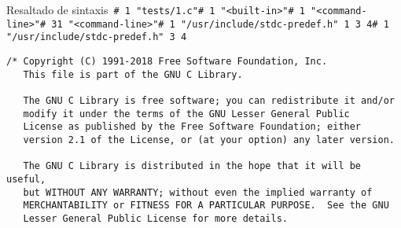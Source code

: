 \begin{frame}{Resaltado de sintaxis}~\color{MidnightBlue}\verb$# 1 "tests/1.c"$\newline\color{MidnightBlue}\verb$# 1 "<built-in>"$\newline\color{MidnightBlue}\verb$# 1 "<command-line>"$\newline\color{MidnightBlue}\verb$# 31 "<command-line>"$\newline\color{MidnightBlue}\verb$# 1 "/usr/include/stdc-predef.h" 1 3 4$\newline\newline\color{MidnightBlue}\verb$# 1 "/usr/include/stdc-predef.h" 3 4$\newline\color{Gray}\begin{verbatim}/* Copyright (C) 1991-2018 Free Software Foundation, Inc.
   This file is part of the GNU C Library.

   The GNU C Library is free software; you can redistribute it and/or
   modify it under the terms of the GNU Lesser General Public
   License as published by the Free Software Foundation; either
   version 2.1 of the License, or (at your option) any later version.

   The GNU C Library is distributed in the hope that it will be useful,
   but WITHOUT ANY WARRANTY; without even the implied warranty of
   MERCHANTABILITY or FITNESS FOR A PARTICULAR PURPOSE.  See the GNU
   Lesser General Public License for more details.


\end{verbatim}
\end{frame}
